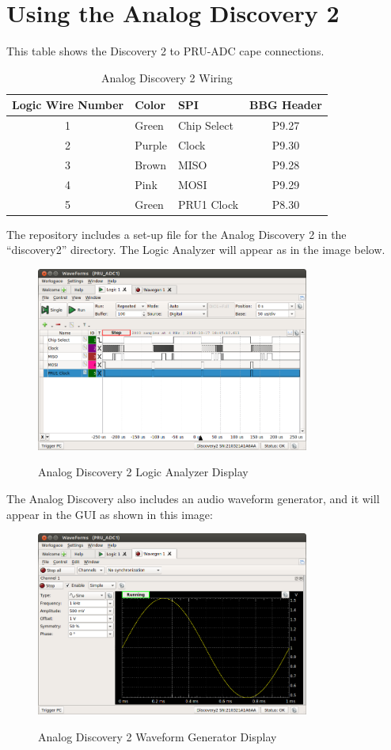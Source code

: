 \chapter{Using the Analog Discovery 2}



This table shows the Discovery 2 to PRU-ADC cape connections.


	\begin{longtable}{cllc}
		\caption{Analog Discovery 2 Wiring}\\
		\toprule
Logic Wire Number & Color & SPI & BBG Header \\\midrule
	1	& Green & Chip Select & P9.27 \\ 
	2	& Purple & Clock & P9.30 \\ 
	3	& Brown & MISO & P9.28 \\ 
	4	& Pink &  MOSI & P9.29 \\ 
	5	& Green & PRU1 Clock & P8.30 \\
	\bottomrule
	\end{longtable}
	
	The repository includes a set-up file for the Analog Discovery 2 in the ``discovery2'' directory.  The Logic Analyzer will appear as in the image below.
	
	\begin{figure}[H]
		\centering
		\includegraphics[width=0.8\textwidth]{photos/discovery2_logic}
		\centering\bfseries
		\caption{Analog Discovery 2 Logic Analyzer Display}
	\end{figure}
	
	The Analog Discovery also includes an audio waveform generator, and it will appear in the GUI as shown in this image:
	
		\begin{figure}[H]
			\centering
			\includegraphics[width=0.8\textwidth]{photos/discovery2_waveform}
			\centering\bfseries
			\caption{Analog Discovery 2 Waveform Generator Display}
		\end{figure}
		
		



	
	
